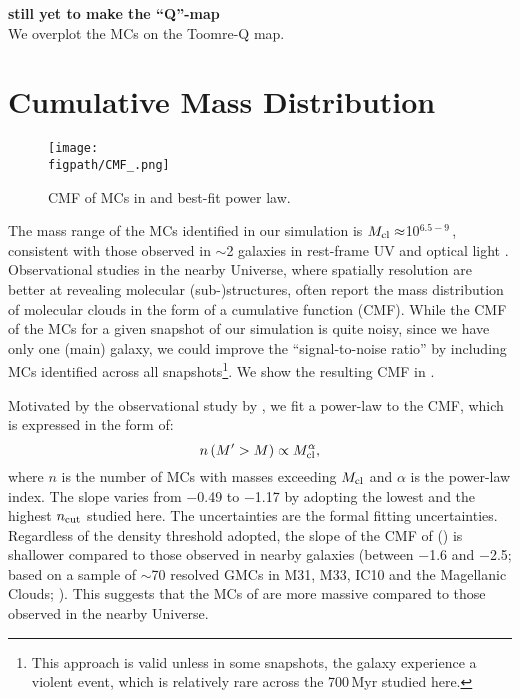 \IfFileExists{emulateapjlegacy.cls}{\documentclass[iop]{emulateapjlegacy}}{\documentclass[iop]{emulateapj}}
\begin{document}
{\bf still yet to make the ``Q''-map} \\

We overplot the MCs on the Toomre-Q map.






\section{Cumulative Mass Distribution}   \label{sec:cmf}

\begin{figure}[htbp]
\centering
\texttt{[image: \\figpath/CMF\_.png]}
\caption{
CMF of MCs in \flower and best-fit power law.
\label{fig:cmf}}
\end{figure}

The mass range of the MCs identified in our simulation is $M_{\rm cl}\approx$10$^{6.5-9}$\,\Msun,
consistent with those observed in \z$\sim$2 galaxies in
rest-frame UV and optical light \citep{Elmegreen07a, Elmegreen09a}.
Observational studies in the nearby Universe, where 
spatially resolution are better at revealing molecular (sub-)structures,
often report the mass distribution of molecular clouds in the form of a cumulative function (CMF).
While the CMF of the MCs for a given snapshot of our simulation is 
quite noisy, since we have only one (main) galaxy, 
we could improve the ``signal-to-noise ratio'' by including 
MCs identified across all snapshots\footnote{This approach is valid unless in some snapshots,
the galaxy experience a violent event, which is relatively rare across the 700\,Myr studied here.}.
We show the resulting CMF in .

Motivated by the observational study by \citealt{Blitz07a}, we fit a power-law to the CMF, which is expressed in the form of:
\begin{equation}
n\left(M^\prime > M\right) \propto M_{\rm cl}^\alpha,
\end{equation}
where $n$ is the number of MCs with masses exceeding $M_{\rm cl}$ and $\alpha$ is the power-law index.
The slope varies from $-$0.49 to $-$1.17 by adopting the lowest and the highest $n_{\rm cut}$ studied here.
The uncertainties are the formal fitting uncertainties.
Regardless of the density threshold adopted, the slope of the CMF of \flower ()
is shallower compared to those observed in nearby galaxies (between $-$1.6 and $-$2.5; based on a sample of
$\sim$70 resolved GMCs in M31, M33, IC10 and the Magellanic Clouds; \citealt{Blitz07a}). %
This suggests that the MCs of \flower are more massive compared to those observed in the nearby Universe.
\end{document}
